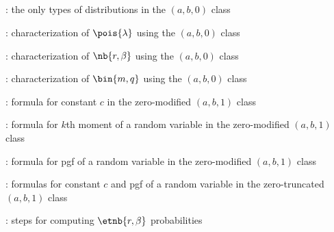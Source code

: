 \subsection*{}
\item {}: the only types of distributions in the \((a,b,0)\) class
\item {}: characterization of \(\pois{\lambda}\) using the \((a,b,0)\) class
\item {}: characterization of \(\nb{r,\beta}\) using the \((a,b,0)\) class
\item {}: characterization of \(\bin{m,q}\) using the \((a,b,0)\) class
\item {}: formula for constant \(c\) in the zero-modified \((a,b,1)\) class
\item {}: formula for \(k\)th moment of a random variable in the zero-modified \((a,b,1)\) class
\item {}: formula for pgf of a random variable in the zero-modified \((a,b,1)\) class
\item {}: formulas for constant \(c\) and pgf of a random variable in the zero-truncated \((a,b,1)\) class
\item {}: steps for computing \(\etnb{r,\beta}\) probabilities

